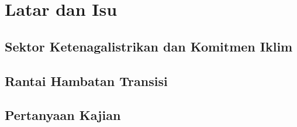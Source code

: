 \section{Latar dan Isu}
\label{sec:latar}

\subsection{Sektor Ketenagalistrikan dan Komitmen Iklim}

\subsection{Rantai Hambatan Transisi}

\subsection{Pertanyaan Kajian}
